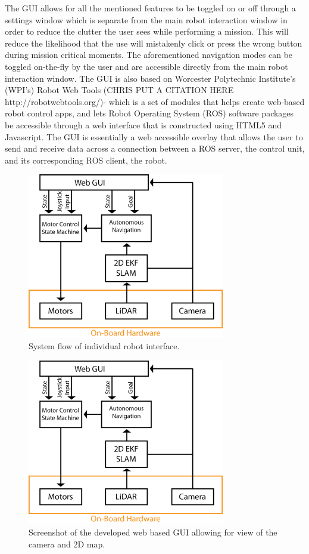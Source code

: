 The GUI allows for all the mentioned features to be toggled on or off through a settings window which is separate from the main robot interaction window in order to reduce the clutter the user sees while performing a mission. This will reduce the likelihood that the use will mistakenly click or press the wrong button during mission critical moments. The aforementioned navigation modes can be toggled on-the-fly by the user and are accessible directly from the main robot interaction window. The GUI is also based on Worcester Polytechnic Institute's (WPI's) Robot Web Tools (CHRIS PUT A CITATION HERE http://robotwebtools.org/)-  which is a set of modules that helps create web-based robot control apps, and lets Robot Operating System (ROS) software packages be accessible through a web interface that is constructed using HTML5 and Javascript. The GUI is essentially a web accessible overlay that allows the user to send and receive data across a connection between a ROS server, the control unit, and its corresponding ROS client, the robot. 
 
\begin{figure}
\centering
\includegraphics[width=3.4in]{pictures/Korpela_GUI.png}
\caption{System flow of individual robot interface.}
\label{gui_flow}
\end{figure}


\begin{figure}
\centering
\includegraphics[width=3.4in]{pictures/Korpela_GUI.png}
\caption{Screenshot of the developed web based GUI allowing for view of the camera and 2D map.}
\label{gui_screenshot}
\end{figure}
